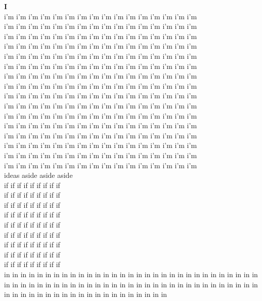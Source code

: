 \vspace{14pt}
\noindent\textbf{\Large I}\\[+12pt]
i'm i'm i'm i'm i'm i'm i'm i'm i'm i'm i'm i'm i'm i'm i'm i'm\\
i'm i'm i'm i'm i'm i'm i'm i'm i'm i'm i'm i'm i'm i'm i'm i'm\\
i'm i'm i'm i'm i'm i'm i'm i'm i'm i'm i'm i'm i'm i'm i'm i'm\\
i'm i'm i'm i'm i'm i'm i'm i'm i'm i'm i'm i'm i'm i'm i'm i'm\\
i'm i'm i'm i'm i'm i'm i'm i'm i'm i'm i'm i'm i'm i'm i'm i'm\\
i'm i'm i'm i'm i'm i'm i'm i'm i'm i'm i'm i'm i'm i'm i'm i'm\\
i'm i'm i'm i'm i'm i'm i'm i'm i'm i'm i'm i'm i'm i'm i'm i'm\\
i'm i'm i'm i'm i'm i'm i'm i'm i'm i'm i'm i'm i'm i'm i'm i'm\\
i'm i'm i'm i'm i'm i'm i'm i'm i'm i'm i'm i'm i'm i'm i'm i'm\\
i'm i'm i'm i'm i'm i'm i'm i'm i'm i'm i'm i'm i'm i'm i'm i'm\\
i'm i'm i'm i'm i'm i'm i'm i'm i'm i'm i'm i'm i'm i'm i'm i'm\\
i'm i'm i'm i'm i'm i'm i'm i'm i'm i'm i'm i'm i'm i'm i'm i'm\\
i'm i'm i'm i'm i'm i'm i'm i'm i'm i'm i'm i'm i'm i'm i'm i'm\\
i'm i'm i'm i'm i'm i'm i'm i'm i'm i'm i'm i'm i'm i'm i'm i'm\\
i'm i'm i'm i'm i'm i'm i'm i'm i'm i'm i'm i'm i'm i'm i'm i'm\\
i'm i'm i'm i'm i'm i'm i'm i'm i'm i'm i'm i'm i'm i'm i'm i'm\\
ideas aside aside aside\\
if if if if if if if if if\\
if if if if if if if if if\\
if if if if if if if if if\\
if if if if if if if if if\\
if if if if if if if if if\\
if if if if if if if if if\\
if if if if if if if if if\\
if if if if if if if if if\\
if if if if if if if if if\\
in in in in in in in in in in in in in in in in in in in in in in in in in in in in in in in in in in in in in in in in in in in in in in in in in in in in in in in in in in in in in in in in in in in in in in in in in in in in in in in in in in\\
